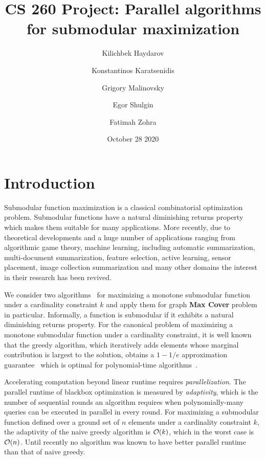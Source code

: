 \documentclass[11pt, a4paper]{article}
\title{CS 260 Project: Parallel algorithms for submodular maximization}
\author{Kilichbek Haydarov \and Konstantinos Karatsenidis \and Grigory Malinovsky \and Egor Shulgin \and Fatimah Zohra}
\date{October 28 2020}
\begin{document}
\maketitle

\section{Introduction}
Submodular function maximization is a classical combinatorial optimization problem. Submodular functions have a natural diminishing returns property which makes them suitable for many applications. More recently, due to theoretical developments and a huge number of applications ranging from algorithmic
game theory, machine learning, including automatic summarization, multi-document summarization, feature selection, active learning, sensor placement, image collection summarization and many other domains the interest in their research has been revived.

We consider two algorithms~\cite{chekuri2018submodular, breuer2019fast} for maximizing a monotone submodular function under a cardinality constraint $k$ and apply them for graph \textbf{Max Cover} problem in particular.
Informally, a function is submodular if it exhibits a natural diminishing returns property.  For the canonical problem of maximizing a monotone submodular function under a cardinality constraint, it is well known that the greedy algorithm, which iteratively adds elements whose marginal contribution is largest to the solution, obtains a $1-1/e$ approximation guarantee~\cite{NWF78} which is optimal for polynomial-time algorithms~\cite{nemhauser1978best}.

Accelerating computation beyond linear runtime requires \emph{parallelization}.  The parallel runtime of blackbox optimization is measured by \emph{adaptivity}, which is the number of sequential rounds an algorithm requires when polynomially-many queries can be executed in parallel in every round.  For maximizing a submodular function defined over a ground set of $n$ elements under a cardinality constraint $k$, the adaptivity of the naive greedy algorithm is ${\cal O}(k)$, which in the worst case is ${\cal O}(n)$.  Until recently no algorithm was known to have better parallel runtime than that of naive greedy. 
\end{document}
